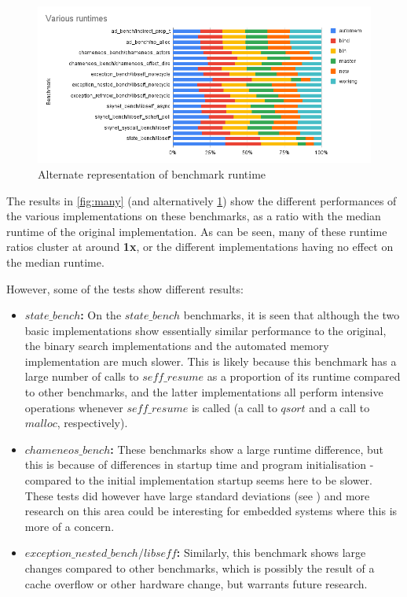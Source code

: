 \documentclass[logo,bsc,singlespacing,parskip,online]{infthesis}
\begin{document}
\begin{figure}[ht]
    \centering
    \includegraphics[width=1\linewidth]{Various runtimes.png}
    \caption{Alternate representation of benchmark runtime}
    \label{fig:squishline}
\end{figure}

The results in \cref{fig:many} (and alternatively \cref{fig:squishline}) show the different performances of the various implementations on these benchmarks, as a ratio with the median runtime of the original implementation. As can be seen, many of these runtime ratios cluster at around \textbf{1x}, or the different implementations having no effect on the median runtime.

However, some of the tests show different results:
\begin{itemize}
    \item \textbf{$state\_bench$:} On the $state\_bench$ benchmarks, it is seen that although the two basic implementations show essentially similar performance to the original, the binary search implementations and the automated memory implementation are much slower. This is likely because this benchmark has a large number of calls to $seff\_resume$ as a proportion of its runtime compared to other benchmarks, and the latter implementations all perform intensive operations whenever $seff\_resume$ is called (a call to $qsort$ and a call to $malloc$, respectively).
    \item \textbf{$chameneos\_bench$:} These benchmarks show a large runtime difference, but this is because of differences in startup time and program initialisation - compared to the initial implementation startup seems here to be slower. These tests did however have large standard deviations (see ) and more research on this area could be interesting for embedded systems where this is more of a concern.
    \item \textbf{$exception\_nested\_bench/libseff$:} Similarly, this benchmark shows large changes compared to other benchmarks, which is possibly the result of a cache overflow or other hardware change, but warrants future research.
\end{itemize}
\end{document}
